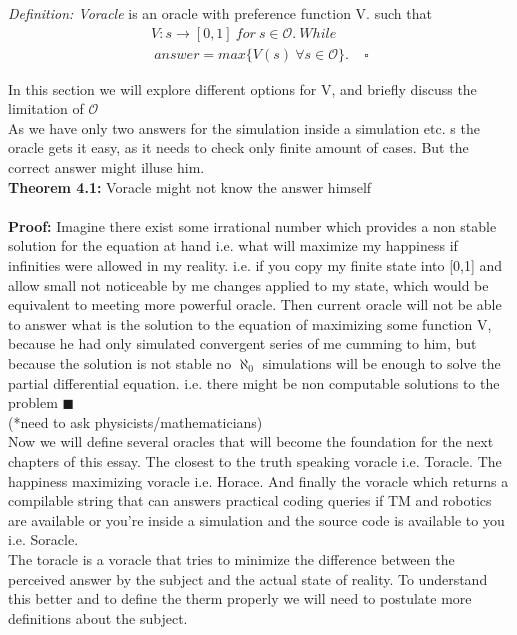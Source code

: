 \documentclass{article}
\begin{document}
\textit{Definition: Voracle} is an oracle with preference function V. such that 
\begin{align*}V: s \to [0,1] \ for \ s \in \mathcal{O}. \ While \\
\ answer = max\{V(s) \ \forall s \in \mathcal{O}\}.\ \ \ \ \  \square
\end{align*} 

In this section we will explore different options for V, and briefly discuss the limitation of $\mathcal{O}$ \\

As we have only two answers for the simulation inside a simulation etc. s the oracle gets it easy, as it needs to check only finite amount of cases. But the correct answer might illuse him. \\

\textbf{Theorem 4.1:} Voracle might not know the answer himself
\\ \\
\textbf{Proof:}
Imagine there exist some irrational number which provides a non stable solution for the equation at hand i.e. what will maximize my happiness if infinities were allowed in my reality. i.e. if you copy my finite state into [0,1] and allow small not noticeable by me changes applied to my state, which would be equivalent to meeting more powerful oracle. Then current oracle will not be able to answer what is the solution to the equation of maximizing some function V, because he had only simulated convergent series of me cumming to him, but because the solution is not stable no $\aleph_0$ simulations will be enough to solve the partial differential equation. i.e. there might be non computable solutions to the problem  $\blacksquare$\\ (*need to ask physicists/mathematicians) \\

Now we will define several oracles that will become the foundation for the next chapters of this essay. The closest to the truth speaking voracle i.e. Toracle. The happiness maximizing voracle i.e. Horace. And finally the voracle which returns a compilable string that can answers practical coding queries if TM and robotics are available or you're inside a simulation and the source code is available to you i.e. Soracle. \\

The toracle is a voracle that tries to minimize the difference between the perceived answer by the subject and the actual state of reality. To understand this better and to define the therm properly we will need to postulate more definitions about the subject. \\
\end{document}
